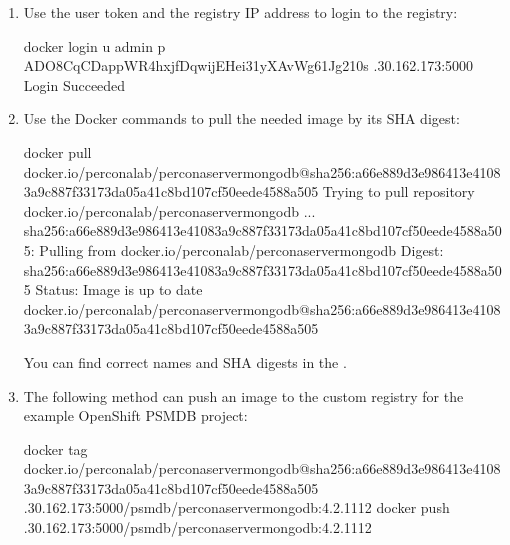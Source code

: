 \documentclass[letterpaper,10pt,english]{sphinxmanual}
\begin{document}
\begin{enumerate}
\item {} 
Use the user token and the registry IP address to login to the
registry:

\begin{sphinxVerbatim}[commandchars=\\\{\}]
\PYGZdl{} docker login \PYGZhy{}u admin \PYGZhy{}p ADO8CqCDappWR4hxjfDqwijEHei31yXAvWg61Jg210s .30.162.173:5000
Login Succeeded
\end{sphinxVerbatim}

\item {} 
Use the Docker commands to pull the needed image by its SHA digest:

\begin{sphinxVerbatim}[commandchars=\\\{\}]
\PYGZdl{} docker pull docker.io/perconalab/percona\PYGZhy{}server\PYGZhy{}mongodb@sha256:a66e889d3e986413e41083a9c887f33173da05a41c8bd107cf50eede4588a505
Trying to pull repository docker.io/perconalab/percona\PYGZhy{}server\PYGZhy{}mongodb ...
sha256:a66e889d3e986413e41083a9c887f33173da05a41c8bd107cf50eede4588a505: Pulling from docker.io/perconalab/percona\PYGZhy{}server\PYGZhy{}mongodb
Digest: sha256:a66e889d3e986413e41083a9c887f33173da05a41c8bd107cf50eede4588a505
Status: Image is up to date  docker.io/perconalab/percona\PYGZhy{}server\PYGZhy{}mongodb@sha256:a66e889d3e986413e41083a9c887f33173da05a41c8bd107cf50eede4588a505
\end{sphinxVerbatim}

You can find correct names and SHA digests in the
{\hyperref[\detokenize{images:custom-registry-images}]{}}.

\item {} 
The following method can push an image to the custom registry
for the example OpenShift PSMDB project:

\begin{sphinxVerbatim}[commandchars=\\\{\}]
\PYGZdl{} docker tag 
    docker.io/perconalab/percona\PYGZhy{}server\PYGZhy{}mongodb@sha256:a66e889d3e986413e41083a9c887f33173da05a41c8bd107cf50eede4588a505 
    .30.162.173:5000/psmdb/percona\PYGZhy{}server\PYGZhy{}mongodb:4.2.11\PYGZhy{}12
\PYGZdl{} docker push .30.162.173:5000/psmdb/percona\PYGZhy{}server\PYGZhy{}mongodb:4.2.11\PYGZhy{}12
\end{sphinxVerbatim}


\end{enumerate}
\end{document}
